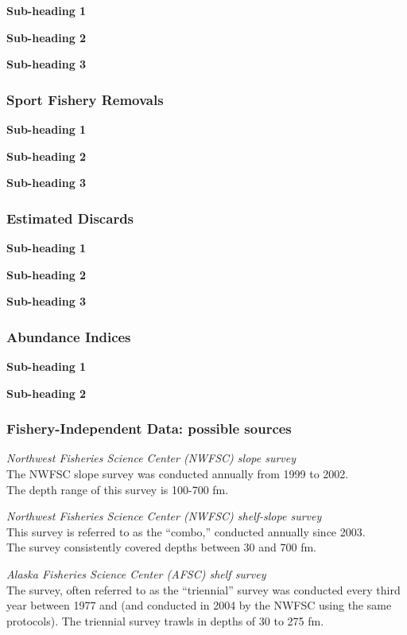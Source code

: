 \documentclass[12pt,]{article}
\begin{document}
\textbf{Sub-heading 1}

\textbf{Sub-heading 2}

\textbf{Sub-heading 3}

\subsubsection{Sport Fishery Removals}\label{sport-fishery-removals}

\textbf{Sub-heading 1}

\textbf{Sub-heading 2}

\textbf{Sub-heading 3}

\subsubsection{Estimated Discards}\label{estimated-discards}

\textbf{Sub-heading 1}

\textbf{Sub-heading 2}

\textbf{Sub-heading 3}

\subsubsection{Abundance Indices}\label{abundance-indices}

\textbf{Sub-heading 1}

\textbf{Sub-heading 2}

\subsubsection{Fishery-Independent Data: possible
sources}\label{fishery-independent-data-possible-sources}

\emph{Northwest Fisheries Science Center (NWFSC) slope survey}\\
The NWFSC slope survey was conducted annually from 1999 to 2002.\\
The depth range of this survey is 100-700 fm.

\emph{Northwest Fisheries Science Center (NWFSC) shelf-slope survey}\\
This survey is referred to as the ``combo,'' conducted annually since
2003.\\
The survey consistently covered depths between 30 and 700 fm.

\emph{Alaska Fisheries Science Center (AFSC) shelf survey}\\
The survey, often referred to as the ``triennial'' survey was conducted
every third year between 1977 and (and conducted in 2004 by the NWFSC
using the same protocols). The triennial survey trawls in depths of 30
to 275 fm.
\end{document}
